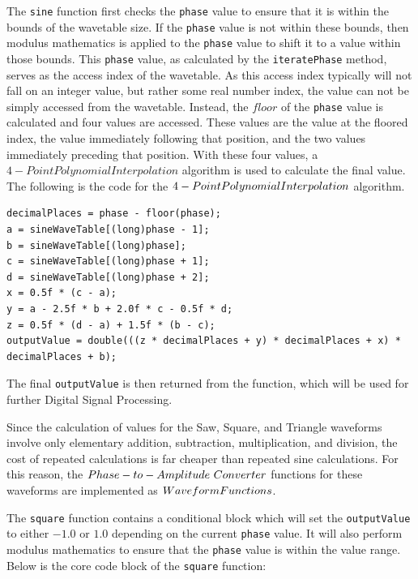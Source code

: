 \documentclass[a4paper,12pt]{report}
\begin{document}
The \texttt{sine} function first checks the \texttt{phase} value to ensure that it is within the bounds of the wavetable size. If the \texttt{phase} value is not within these bounds, then modulus mathematics is applied to the \texttt{phase} value to shift it to a value within those bounds. This \texttt{phase} value, as calculated by the \texttt{iterate\-Phase} method, serves as the access index of the wavetable. As this access index typically will not fall on an integer value, but rather some real number index, the value can not be simply accessed from the wavetable. Instead, the $floor$ of the \texttt{phase} value is calculated and four values are accessed. These values are the value at the floored index, the value immediately following that position, and the two values immediately preceding that position. With these four values, a $4-Point Polynomial Interpolation$ algorithm is used to calculate the final value. The following is the code for the $4-Point \-Polynomial \-Interpolation$ algorithm.

 \noindent\begin{minipage}{\linewidth} \begin{lstlisting}[caption={4-Point Polynomial Interpolation implementation},label={code:4ptpolyinterpolation},captionpos=b]
decimalPlaces = phase - floor(phase);
a = sineWaveTable[(long)phase - 1];
b = sineWaveTable[(long)phase];
c = sineWaveTable[(long)phase + 1];
d = sineWaveTable[(long)phase + 2];
x = 0.5f * (c - a);
y = a - 2.5f * b + 2.0f * c - 0.5f * d;
z = 0.5f * (d - a) + 1.5f * (b - c);
outputValue = double(((z * decimalPlaces + y) * decimalPlaces + x) * decimalPlaces + b);
\end{lstlisting} \end{minipage}

The final \texttt{output\-Value} is then returned from the function, which will be used for further Digital Signal Processing.

Since the calculation of values for the Saw, Square, and Triangle waveforms involve only elementary addition, subtraction, multiplication, and division, the cost of repeated calculations is far cheaper than repeated sine calculations. For this reason, the $Phase-to-Amplitude\ \-Converter$ functions for these waveforms are implemented as $Waveform \-Functions$.

The \texttt{square} function contains a conditional block which will set the \texttt{output\-Value} to either $-1.0$ or $1.0$ depending on the current \texttt{phase} value. It will also perform modulus mathematics to ensure that the \texttt{phase} value is within the value range. Below is the core code block of the \texttt{square} function:
\end{document}
